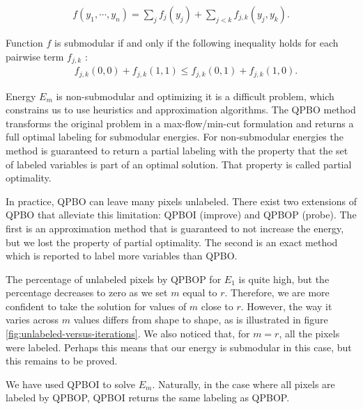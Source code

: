 \documentclass[runningheads]{llncs}
\begin{document}
\begin{align*}
f(y_1,\cdots, y_n) = \sum_{j}{f_j(y_j)} + \sum_{j < k}{f_{j,k}(y_j,y_k)}.
\end{align*}

Function $f$ is submodular if and only if the following inequality holds for each pairwise term $f_{j,k}$ \cite{kolmogorov04whatenergies}:
\begin{align*}
  \quad f_{j,k}(0,0) + f_{j,k}(1,1) \leq f_{j,k}(0,1) + f_{j,k}(1,0).
\end{align*}

Energy $E_m$ is non-submodular and optimizing it is a difficult
problem, which constrains us to use heuristics and approximation
algorithms. The QPBO method \cite{rother07qpbo} transforms the
original problem in a max-flow/min-cut formulation and returns a full
optimal labeling for submodular energies. For non-submodular energies
the method is guaranteed to return a partial labeling with the
property that the set of labeled variables is part of an optimal
solution. That property is called partial optimality.

In practice, QPBO can leave many pixels unlabeled. There exist two
extensions of QPBO that alleviate this limitation: QPBOI (improve) and
QPBOP (probe). The first is an approximation method that is guaranteed
to not increase the energy, but we lost the property of partial
optimality. The second is an exact method which is reported to label
more variables than QPBO.

The percentage of unlabeled pixels by QPBOP for $E_1$ is quite high,
but the percentage decreases to zero as we set $m$ equal to
$r$. Therefore, we are more confident to take the solution for values
of $m$ close to $r$. However, the way it varies across $m$ values
differs from shape to shape, as is illustrated in figure
\ref{fig:unlabeled-versus-iterations}. We also noticed that, for
$m=r$, all the pixels were labeled. Perhaps this means that our energy
is submodular in this case, but this remains to be proved.

We have used QPBOI to solve $E_m$. Naturally, in the case where all
pixels are labeled by QPBOP, QPBOI returns the same labeling as QPBOP.
\end{document}
